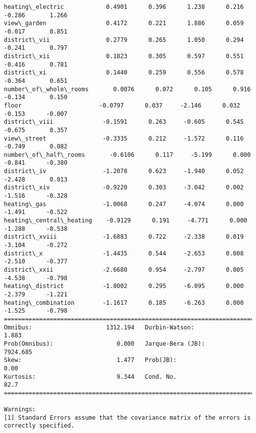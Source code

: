 \documentclass[11pt]{article}
\begin{document}
\begin{Verbatim}[commandchars=\\\{\}]
heating\_electric            0.4901      0.396      1.238      0.216      -0.286       1.266
view\_garden                 0.4172      0.221      1.886      0.059      -0.017       0.851
district\_vii                0.2779      0.265      1.050      0.294      -0.241       0.797
district\_xii                0.1823      0.305      0.597      0.551      -0.416       0.781
district\_xi                 0.1440      0.259      0.556      0.578      -0.364       0.651
number\_of\_whole\_rooms       0.0076      0.072      0.105      0.916      -0.134       0.150
floor                      -0.0797      0.037     -2.146      0.032      -0.153      -0.007
district\_viii              -0.1591      0.263     -0.605      0.545      -0.675       0.357
view\_street                -0.3335      0.212     -1.572      0.116      -0.749       0.082
number\_of\_half\_rooms       -0.6106      0.117     -5.199      0.000      -0.841      -0.380
district\_iv                -1.2078      0.623     -1.940      0.052      -2.428       0.013
district\_xiv               -0.9220      0.303     -3.042      0.002      -1.516      -0.328
heating\_gas                -1.0068      0.247     -4.074      0.000      -1.491      -0.522
heating\_central\_heating    -0.9129      0.191     -4.771      0.000      -1.288      -0.538
district\_xviii             -1.6883      0.722     -2.338      0.019      -3.104      -0.272
district\_x                 -1.4435      0.544     -2.653      0.008      -2.510      -0.377
district\_xxii              -2.6680      0.954     -2.797      0.005      -4.538      -0.798
heating\_district           -1.8002      0.295     -6.095      0.000      -2.379      -1.221
heating\_combination        -1.1617      0.185     -6.263      0.000      -1.525      -0.798
==============================================================================
Omnibus:                     1312.194   Durbin-Watson:                   1.883
Prob(Omnibus):                  0.000   Jarque-Bera (JB):             7924.685
Skew:                           1.477   Prob(JB):                         0.00
Kurtosis:                       9.344   Cond. No.                         82.7
==============================================================================

Warnings:
[1] Standard Errors assume that the covariance matrix of the errors is correctly specified.

    \end{Verbatim}
\end{document}
